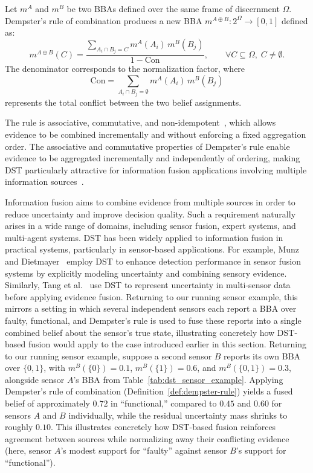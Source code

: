 \begin{definition}
\label{def:dempster-rule}
Let \( m^A \) and \( m^B \) be two \acp{BBA} defined over the same frame of discernment \( \Omega \). 
Dempster’s rule of combination produces a new \ac{BBA} 
\( m^{A \oplus B} : 2^{\Omega} \rightarrow [0,1] \) defined as:
\begin{equation}
m^{A \oplus B}(C)
=
\frac{
\displaystyle \sum_{A_i \cap B_j = C} m^A(A_i)\, m^B(B_j)
}{1 - \text{Con}},
\qquad \forall C \subseteq \Omega,\; C \neq \emptyset.
\end{equation}
The denominator corresponds to the normalization factor, where
\[
\text{Con} = \sum_{A_i \cap B_j = \emptyset} m^A(A_i)\, m^B(B_j)
\]
represents the total conflict between the two belief assignments.
\end{definition}


The rule is associative, commutative, and non-idempotent~\cite{josang2012dempster}, which allows evidence to be combined incrementally and without enforcing a fixed aggregation order. The associative and commutative properties of Dempster’s rule enable evidence to be aggregated incrementally and independently of ordering, making \ac{DST} particularly attractive for information fusion applications involving multiple information sources~\cite{LEFEVRE2002149, osti_800792, 1006807, Khan2019TimeDomain}.

Information fusion aims to combine evidence from multiple sources in order to reduce uncertainty and improve decision quality. Such a requirement naturally arises in a wide range of domains, including sensor fusion, expert systems, and multi-agent systems. \ac{DST} has been widely applied to information fusion in practical systems, particularly in sensor-based applications. For example, Munz and Dietmayer~\cite{munz2011using} employ \ac{DST} to enhance detection performance in sensor fusion systems by explicitly modeling uncertainty and combining sensory evidence. Similarly, Tang et al.~\cite{tang2017improved} use \ac{DST} to represent uncertainty in multi-sensor data before applying evidence fusion. Returning to our running sensor example, this mirrors a setting in which several independent sensors each report a BBA over {faulty, functional}, and Dempster's rule is used to fuse these reports into a single combined belief about the sensor's true state, illustrating concretely how DST-based fusion would apply to the case introduced earlier in this section. Returning to our running sensor example, suppose a second sensor $B$ reports its own \ac{BBA} over $\{0,1\}$, with $m^B(\{0\}) = 0.1$, $m^B(\{1\}) = 0.6$, and $m^B(\{0,1\}) = 0.3$, alongside sensor $A$'s \ac{BBA} from Table~\ref{tab:dst_sensor_example}. Applying Dempster's rule of combination (Definition~\cref{def:dempster-rule}) yields a fused belief of approximately $0.72$ in ``functional,'' compared to $0.45$ and $0.60$ for sensors $A$ and $B$ individually, while the residual uncertainty mass shrinks to roughly $0.10$. This illustrates concretely how DST-based fusion reinforces agreement between sources while normalizing away their conflicting evidence (here, sensor $A$'s modest support for ``faulty'' against sensor $B$'s support for ``functional'').


